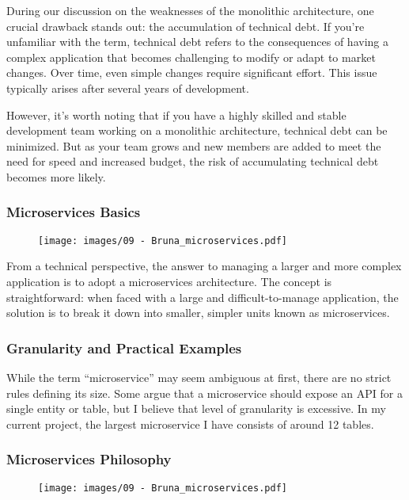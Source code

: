 During our discussion on the weaknesses of the monolithic architecture,
one crucial drawback stands out: the accumulation of technical debt. If
you're unfamiliar with the term, technical debt refers to the
consequences of having a complex application that becomes challenging to
modify or adapt to market changes. Over time, even simple changes
require significant effort. This issue typically arises after several
years of development.

However, it's worth noting that if you have a highly skilled and stable
development team working on a monolithic architecture, technical debt
can be minimized. But as your team grows and new members are added to
meet the need for speed and increased budget, the risk of accumulating
technical debt becomes more likely.

\subsubsection{Microservices Basics}

\begin{figure}[!h]
  \centering
  \texttt{[image: images/09 - Bruna\_microservices.pdf]}
\end{figure}

From a technical perspective, the answer to managing a larger and more
complex application is to adopt a microservices architecture. The
concept is straightforward: when faced with a large and
difficult-to-manage application, the solution is to break it down into
smaller, simpler units known as microservices.

\subsubsection{Granularity and Practical Examples}

While the term ``microservice'' may seem ambiguous at first, there are
no strict rules defining its size. Some argue that a microservice should
expose an API for a single entity or table, but I believe that level of
granularity is excessive. In my current project, the largest
microservice I have consists of around 12 tables.

\subsubsection{Microservices Philosophy}

\begin{figure}[!h]
  \centering
  \texttt{[image: images/09 - Bruna\_microservices.pdf]}
\end{figure}

